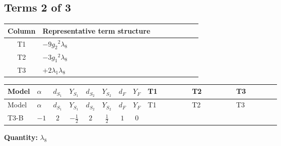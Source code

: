 \documentclass[8pt]{article}
\begin{document}
\begin{landscape}
\subsection*{Terms 2 of 3}
\begin{center}
\begin{tabular}{@{}c >{\raggedright\arraybackslash}p{0.82\linewidth}@{}}
\toprule
Column & Representative term structure \\
\midrule
T1 & \(\displaystyle -9 {g_2}^2 {\lambda_{8}}\) \\
\midrule
T2 & \(\displaystyle -3 {g_1}^2 {\lambda_{8}}\) \\
\midrule
T3 & \(\displaystyle +2 {\lambda_1} {\lambda_{8}}\) \\
\midrule
\bottomrule
\end{tabular}
\end{center}
\smallskip
\tiny
\begin{longtable}{@{}llcccccc >{\raggedright\arraybackslash}p{0.21\linewidth} >{\raggedright\arraybackslash}p{0.21\linewidth} >{\raggedright\arraybackslash}p{0.21\linewidth}@{}}
\toprule
Model & $\alpha$ & $d_{S_1}$ & $Y_{S_1}$ & $d_{S_2}$ & $Y_{S_2}$ & $d_F$ & $Y_F$ & T1 & T2 & T3 \\
\midrule
\endfirsthead
\toprule
Model & $\alpha$ & $d_{S_1}$ & $Y_{S_1}$ & $d_{S_2}$ & $Y_{S_2}$ & $d_F$ & $Y_F$ & T1 & T2 & T3 \\
\midrule
\endhead
T3-B & $-1$ & $2$ & $-\frac{1}{2}$ & $2$ & $\frac{1}{2}$ & $1$ & $0$ & \scriptsize\adjustbox{max width=\linewidth}{$\begin{gathered} -9 {g_2}^2 {\lambda_{8}}\end{gathered}$} & \scriptsize\adjustbox{max width=\linewidth}{$\begin{gathered} -3 {g_1}^2 {\lambda_{8}}\end{gathered}$} & \scriptsize\adjustbox{max width=\linewidth}{$\begin{gathered} +2 {\lambda_1} {\lambda_{8}}\end{gathered}$} \\
\midrule
\bottomrule
\end{longtable}
\clearpage
\noindent\textbf{Quantity: }$\lambda_{8}$\par\smallskip

\end{landscape}
\end{document}
